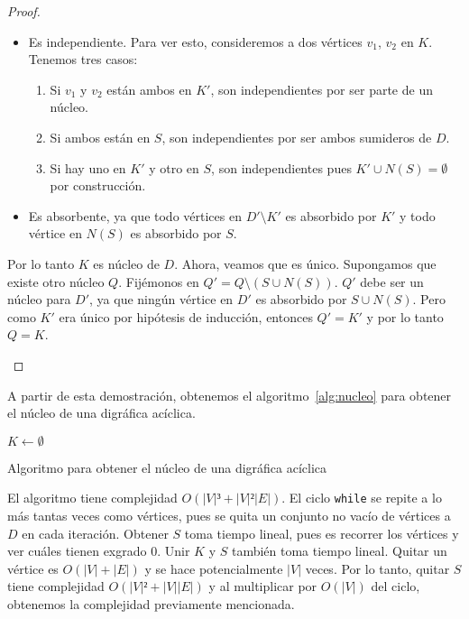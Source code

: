 \documentclass{article}
\begin{document}
\begin{enumerate}
\begin{proof}
\begin{itemize}
        \begin{itemize}
          \item Es independiente. Para ver esto, consideremos a dos v\'ertices
            $v_1$, $v_2$ en $K$. Tenemos tres casos:
            \begin{enumerate}
              \item Si $v_1$ y $v_2$ est\'an ambos en $K'$, son independientes por
                ser parte de un n\'ucleo.
              \item Si ambos est\'an en $S$, son independientes por ser ambos
                sumideros de $D$.
              \item Si hay uno en $K'$ y otro en $S$, son independientes pues
                $K' \cup N(S) = \emptyset$ por construcci\'on.
              \end{enumerate}
            \item Es absorbente, ya que todo v\'ertices en $D' \setminus K'$ es absorbido por
              $K'$ y todo v\'ertice en $N(S)$ es absorbido por $S$.
            \end{itemize}
            Por lo tanto $K$ es n\'ucleo de $D$. Ahora, veamos que es
            \'unico. Supongamos que existe otro n\'ucleo $Q$. Fij\'emonos en $Q' = Q
            \setminus (S \cup N(S))$. $Q'$ debe ser un n\'ucleo para $D'$, ya que
            ning\'un v\'ertice en $D'$ es absorbido por $S \cup N(S)$. Pero como
            $K'$ era \'unico por hip\'otesis de inducci\'on, entonces $Q' = K'$ y por
            lo tanto $Q = K$.
      \end{itemize}
    \end{proof}

    A partir de esta demostraci\'on, obtenemos el algoritmo~\ref{alg:nucleo} para obtener
    el n\'ucleo de una digr\'afica ac\'iclica.
    
    \begin{center}
      \begin{algorithm}[H]
        \SetAlgoLined
        $K \gets \emptyset$\;
        \caption{Algoritmo para obtener el núcleo de una digráfica acíclica}
        \label{alg:nucleo}
      \end{algorithm}

      El algoritmo tiene complejidad $O(|V|³ + |V|²|E|)$. El ciclo \texttt{while} se repite
      a lo m\'as tantas veces como v\'ertices, pues se quita un conjunto no
      vac\'io de v\'ertices a $D$ en cada iteraci\'on. Obtener $S$ toma tiempo
      lineal, pues es recorrer los v\'ertices y ver cu\'ales tienen exgrado
      $0$. Unir $K$ y $S$ tambi\'en toma tiempo lineal. Quitar un v\'ertice es
      $O(|V| + |E|)$ y se hace potencialmente $|V|$ veces. Por lo tanto, quitar
      $S$ tiene complejidad $O(|V|² + |V||E|)$ y al multiplicar por $O(|V|)$ del
      ciclo, obtenemos la complejidad previamente mencionada.
    \end{center}


\end{enumerate}
\end{document}
